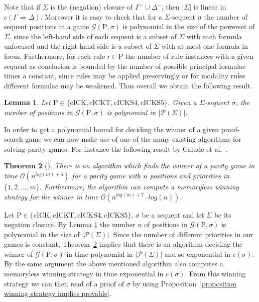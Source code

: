 \documentclass{myifcolog}
\newcommand{\hickp}{\mathrm{P}}
\newcommand{\cick}{\mathrm{cICK}}
\newcommand{\cickt}{\mathrm{cICKT}}
\newcommand{\cicks}{\mathrm{cICKS4}}
\newcommand{\cickss}{\mathrm{cICKS5}}
\newtheorem{theorem}{Theorem}
\newtheorem{lemma}[theorem]{Lemma}
\numberwithin{theorem}{section}
\begin{document}
Note that if $\Sigma$ is the (negation) closure of $\Gamma^- \cup \Delta^-$, then $\lvert \Sigma \rvert$ is linear in $c(\Gamma \Rightarrow \Delta)$. Moreover it is easy to check that for a $\Sigma$-sequent $\sigma$ the number of sequent positions in a game $\mathscr{G}(\hickp, \sigma)$ is polynomial in the size of the powerset of $\Sigma$, since the left-hand side of each sequent is a subset of $\Sigma$ with each formula unfocused and the right hand side is a subset of $\Sigma$ with at most one formula in focus. Furthermore, for each rule $\mathsf{r} \in \hickp$ the number of rule instances with a given sequent as conclusion is bounded by the number of possible principal formulae times a constant, since rules may be applied preservingly or for modality rules different formulae may be weakened. Thus overall we obtain the following result. 
    
	\begin{lemma}\label{l: number of positions in games}
		Let $\hickp \in \{\cick, \cickt, \cicks, \cickss\}$. Given a $\Sigma$-sequent $\sigma$, the number of positions in $\mathscr{G}(\hickp,\sigma)$ is polynomial in $\lvert \mathcal{P}(\Sigma) \rvert$.
	\end{lemma}
	
    In order to get a polynomial bound for deciding the winner of a given proof-search game we can now make use of one of the many existing algorithms for solving parity games. For instance the following result by Calude et al.~\cite{calude_2017}. 
	\begin{theorem}[{\cite[Theorem 2.9]{calude_2017}}]\label{Theorem 2.9 Calude}
		There is an algorithm which finds the winner of a parity game in time $\mathcal{O}(n^{log(m)+6})$ for a parity game with $n$ positions and priorities in $\{1,2,...,m\}$. Furthermore, the algorithm can compute a memoryless winning strategy for the winner in time $\mathcal{O}(n^{log(m)+7} \cdot log(n))$.
	\end{theorem}
	
	Let $\hickp \in \{\cick, \cickt, \cicks, \cickss\}$, $\sigma$ be a sequent and let $\Sigma$ be its negation closure. By Lemma \ref{l: number of positions in games} the number $n$ of positions in $\mathscr{G}(\hickp,\sigma)$ is polynomial in the size of $\lvert \mathcal{P}(\Sigma) \lvert$. Since the number of different priorities in our games is constant, Theorem~\ref{Theorem 2.9 Calude} implies that there is an algorithm deciding the winner of $\mathscr{G}(\hickp,\sigma)$ in time polynomial in $\lvert \mathcal{P}(\Sigma) \lvert$ and so exponential in $c(\sigma)$. By the same argument the above mentioned algorithm also computes a memoryless winning strategy in time exponential in  $c(\sigma)$. From this winning strategy we can then read of a proof of $\sigma$ by using Proposition~\ref{proposition winning strategy implies provable}.
	
\end{document}

